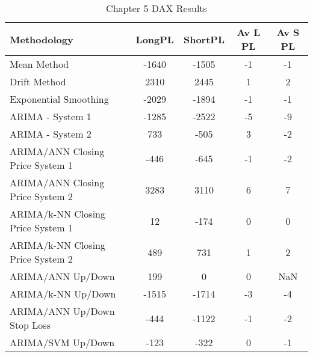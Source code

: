 \begin{table}[ht]
\centering
\caption[Chapter 5 DAX Results]{Chapter 5 DAX Results} 
\label{tab:chp6:dax2_summary}
\begin{tabular}{lcccc}
  \toprule Methodology & LongPL & ShortPL & Av L PL & Av S PL \\ 
  \midrule Mean Method & -1640 & -1505 & -1 & -1 \\ 
  Drift Method & 2310 & 2445 & 1 & 2 \\ 
  Exponential Smoothing & -2029 & -1894 & -1 & -1 \\ 
  ARIMA - System 1 & -1285 & -2522 & -5 & -9 \\ 
  ARIMA - System 2 & 733 & -505 & 3 & -2 \\ 
  ARIMA/ANN Closing Price System 1 & -446 & -645 & -1 & -2 \\ 
  ARIMA/ANN Closing Price System 2 & 3283 & 3110 & 6 & 7 \\ 
  ARIMA/k-NN Closing Price System 1 & 12 & -174 & 0 & 0 \\ 
  ARIMA/k-NN Closing Price System 2 & 489 & 731 & 1 & 2 \\ 
  ARIMA/ANN Up/Down & 199 & 0 & 0 & NaN \\ 
  ARIMA/k-NN Up/Down & -1515 & -1714 & -3 & -4 \\ 
  ARIMA/ANN Up/Down Stop Loss & -444 & -1122 & -1 & -2 \\ 
  ARIMA/SVM Up/Down & -123 & -322 & 0 & -1 \\ 
   \bottomrule \end{tabular}
\end{table}
